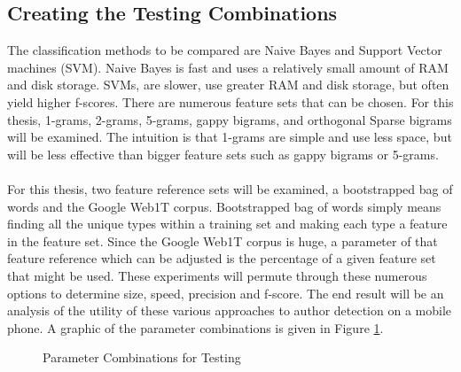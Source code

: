 	\subsection{Creating the Testing Combinations} The classification methods to be compared are Naive Bayes and Support Vector machines (SVM). Naive Bayes is fast and uses a relatively small amount of RAM and disk storage. SVMs, are slower, use greater RAM and disk storage, but often yield higher f-scores.  There are numerous feature sets that can be chosen.  For this thesis, 1-grams, 2-grams, 5-grams, gappy bigrams, and orthogonal Sparse bigrams will be examined.  The intuition is that 1-grams are simple and use less space, but will be less effective than bigger feature sets such as gappy bigrams or 5-grams.
	\paragraph{} For this thesis, two feature reference sets will be examined, a bootstrapped bag of words and the Google Web1T corpus.  Bootstrapped bag of words simply means finding all the unique types within a training set and making each type a feature in the feature set. Since the Google Web1T corpus is huge, a parameter of that feature reference which can be adjusted is the percentage of a given feature set that might be used.  These experiments will permute through these numerous options to determine size, speed, precision and f-score.  The end result will be an analysis of the utility of these various approaches to author detection on a mobile phone.  A graphic of the parameter combinations is given in Figure \ref{fig:parameterCombinations}.   
	
	\begin{figure}[ht!]
		\begin{center}
			\caption{Parameter Combinations for Testing}
			\label{fig:parameterCombinations}
		\end{center}
	\end{figure}
	

